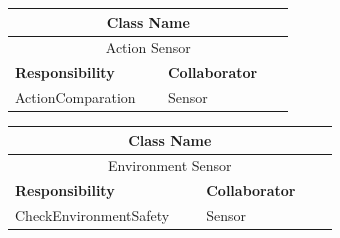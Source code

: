 \documentclass[a4paper]{article}
\begin{document}
	\noindent\begin{minipage}{\textwidth}
		\begin{minipage}[t]{0.48\textwidth}
	 	\centering
		\makeatletter{}\makeatother\caption*{}
		  	\begin{tabular}{|p{0.48\linewidth}|p{0.40\linewidth}|} 
	   			\hline
				\multicolumn{2}{|c|}{\textbf{Class Name}} \\
				\hline
				\multicolumn{2}{|c|}{Action Sensor} \\
				\hline
				\textbf{Responsibility} & \textbf{Collaborator} \\
				\hline
				ActionComparation & Sensor\\
				\hline
	   		\end{tabular}
	 	\end{minipage}
	 	\begin{minipage}[t]{0.48\textwidth}
		\centering
		\makeatletter{}\makeatother\caption*{}
			\begin{tabular}{|p{0.52\linewidth}|p{0.36\linewidth}|} 
				\hline
				\multicolumn{2}{|c|}{\textbf{Class Name}} \\
				\hline
				\multicolumn{2}{|c|}{Environment Sensor} \\
				\hline
				\textbf{Responsibility} & \textbf{Collaborator} \\
				\hline
				CheckEnvironmentSafety& Sensor\\
				\hline
			\end{tabular}
		\end{minipage}
   	\end{minipage}
\end{document}
